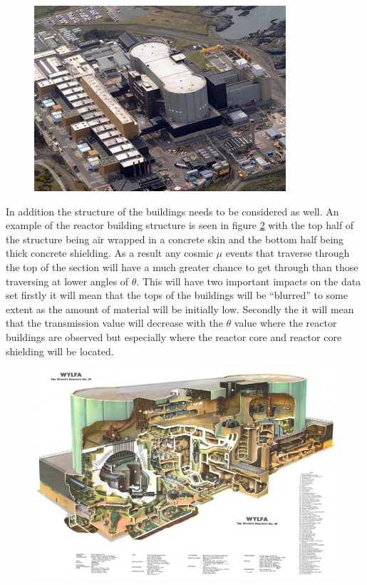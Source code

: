 \begin{figure}[htbp]
 \centering
 \includegraphics[width=0.6\linewidth]{Chapter5/Figs/Raster/wylfaArielView.png}
 \label{fig:wylfaAir}
\end{figure}

In addition the structure of the buildings needs to be considered as well. An example of the reactor building structure is seen in figure \ref{fig:wylfaReactorRoughStructure} with the top half of the structure being air wrapped in a concrete skin and the bottom half being thick concrete shielding. As a result any cosmic $\mu$ events that traverse through the top of the section will have a much greater chance to get through than those traversing at lower angles of $\theta$. This will have two important impacts on the data set firstly it will mean that the tops of the buildings will be ``blurred'' to some extent as the amount of material will be initially low. Secondly the it will mean that the transmission value will decrease with the $\theta$ value where the reactor buildings are observed but especially where the reactor core and reactor core shielding will be located. 

\begin{figure}[htbp]
 \centering
 \includegraphics[width=0.6\linewidth]{Chapter5/Figs/wylfaRasterNew/wylfaReactorRoughStructure.png}
 \label{fig:wylfaReactorRoughStructure}
\end{figure}

